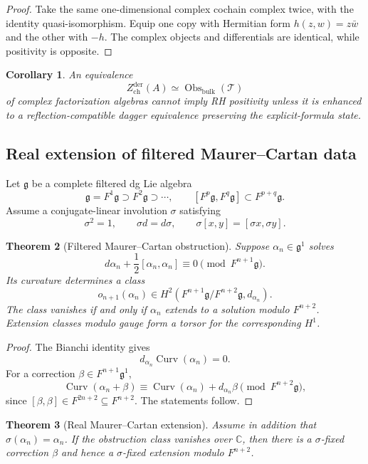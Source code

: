 \documentclass[11pt]{article}
\newtheorem{theorem}{Theorem}[section]
\newtheorem{corollary}[theorem]{Corollary}
\theoremstyle{definition}
\theoremstyle{remark}
\newcommand{\CC}{\mathbb C}
\newcommand{\1}{\mathbf 1}
\newcommand{\cG}{\mathfrak g}
\begin{document}
\begin{proof}
Take the same one-dimensional complex cochain complex twice, with the identity quasi-isomorphism.  Equip one copy with Hermitian form $h(z,w)=z\bar w$ and the other with $-h$.  The complex objects and differentials are identical, while positivity is opposite.
\end{proof}

\begin{corollary}
An equivalence
\[
Z^{\mathrm{der}}_{\mathrm{ch}}(A)\simeq\operatorname{Obs}_{\mathrm{bulk}}(\mathcal T)
\]
of complex factorization algebras cannot imply RH positivity unless it is enhanced to a reflection-compatible dagger equivalence preserving the explicit-formula state.
\end{corollary}

\subsection{Real extension of filtered Maurer--Cartan data}

Let $\cG$ be a complete filtered dg Lie algebra
\[
\cG=F^1\cG\supset F^2\cG\supset\cdots,
\qquad
[F^p\cG,F^q\cG]\subset F^{p+q}\cG.
\]
Assume a conjugate-linear involution $\sigma$ satisfying
\[
\sigma^2=1,
\qquad
\sigma d=d\sigma,
\qquad
\sigma[x,y]=[\sigma x,\sigma y].
\]

\begin{theorem}[Filtered Maurer--Cartan obstruction]
Suppose $\alpha_n\in\cG^1$ solves
\[
d\alpha_n+\frac12[\alpha_n,\alpha_n]\equiv0\pmod{F^{n+1}\cG}.
\]
Its curvature determines a class
\[
o_{n+1}(\alpha_n)
\in
H^2\left(F^{n+1}\cG/F^{n+2}\cG,d_{\alpha_n}\right).
\]
The class vanishes if and only if $\alpha_n$ extends to a solution modulo $F^{n+2}$.  Extension classes modulo gauge form a torsor for the corresponding $H^1$.
\end{theorem}

\begin{proof}
The Bianchi identity gives
\[
d_{\alpha_n}\operatorname{Curv}(\alpha_n)=0.
\]
For a correction $\beta\in F^{n+1}\cG^1$,
\[
\operatorname{Curv}(\alpha_n+\beta)
\equiv
\operatorname{Curv}(\alpha_n)+d_{\alpha_n}\beta
\pmod{F^{n+2}\cG},
\]
since $[\beta,\beta]\in F^{2n+2}\subseteq F^{n+2}$.  The statements follow.
\end{proof}

\begin{theorem}[Real Maurer--Cartan extension]
Assume in addition that $\sigma(\alpha_n)=\alpha_n$.  If the obstruction class vanishes over $\CC$, then there is a $\sigma$-fixed correction $\beta$ and hence a $\sigma$-fixed extension modulo $F^{n+2}$.
\end{theorem}
\end{document}
